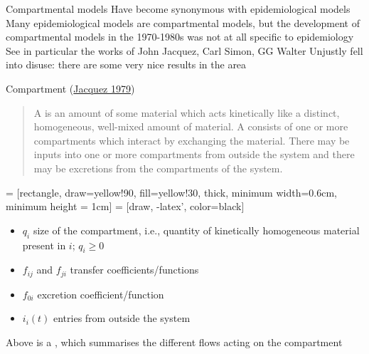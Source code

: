 \documentclass[aspectratio=169]{beamer}\usepackage[]{graphicx}\usepackage[]{xcolor}
\begin{document}
\begin{frame}{Compartmental models}
\bbullet Have become synonymous with epidemiological models
\vfill
\bbullet Many epidemiological models are compartmental models, but the development of compartmental models in the 1970-1980s was not at all specific to epidemiology
\vfill
\bbullet See in particular the works of John Jacquez, Carl Simon, GG Walter
\vfill
\bbullet Unjustly fell into disuse: there are some very nice results in the area    
\end{frame}

\begin{frame}{Compartment (\href{https://doi-org.uml.idm.oclc.org/10.1016/B978-0-12-434180-7.50021-8}{Jacquez 1979})}

\begin{quote}
  A  is an amount of some material which acts kinetically like a distinct, homogeneous, well-mixed amount of material. A  consists of one or more compartments which interact by exchanging the material. There may be inputs into one or more compartments from outside the system and there may be excretions from the compartments of the system.   
\end{quote}
\end{frame}

\begin{frame}{}
  \begin{minipage}{0.4\textwidth}
     = [rectangle, 
    draw=yellow!90, 
    fill=yellow!30, 
    thick, 
    minimum width=0.6cm,
    minimum height = 1cm]
     = [draw, 
    -latex', 
    color=black]
  \end{minipage}
  \begin{minipage}{0.55\textwidth}
    \begin{itemize}
      \item $q_i$ size of the compartment, i.e., quantity of kinetically homogeneous material present in $i$; $q_i\geq 0$ 
      \item $f_{ij}$ and $f_{ji}$ transfer coefficients/functions
      \item $f_{0i}$ excretion coefficient/function
      \item $i_i(t)$ entries from outside the system
    \end{itemize}
  \end{minipage}
  \vfill
  Above is a , which summarises the different flows acting on the compartment
\end{frame}
\end{document}
